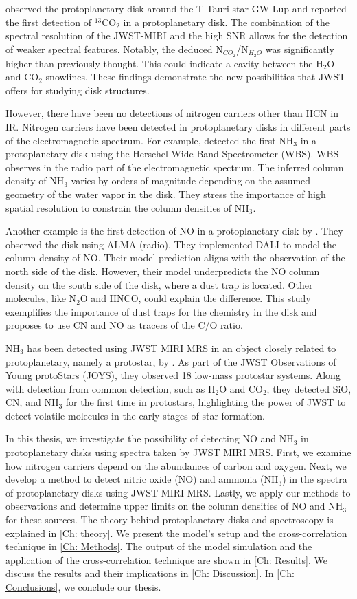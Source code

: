 \documentclass[oneside, single, authoryear, semicolon, 12pt]{lion-msc}
\newcommand{\4}{$_4$}
\newcommand{\3}{$_3$}
\newcommand{\2}{$_2$}
\begin{document}
\cite{Grant_2023} observed the protoplanetary disk around the T Tauri star GW Lup and reported the first detection of $^{13}$CO$_2$ in a protoplanetary disk. The combination of the spectral resolution of the JWST-MIRI and the high SNR allows for the detection of weaker spectral features. Notably, the deduced N$_{CO_2}$/N$_{H_2O}$ was significantly higher than previously thought. This could indicate a cavity between the H$_2$O and CO$_2$ snowlines. These findings demonstrate the new possibilities that JWST offers for studying disk structures. 

However, there have been no detections of nitrogen carriers other than HCN in IR. Nitrogen carriers have been detected in protoplanetary disks in different parts of the electromagnetic spectrum. For example, \cite{Salinas_2016} detected the first NH\3 in a protoplanetary disk using the Herschel Wide Band Spectrometer (WBS). WBS observes in the radio part of the electromagnetic spectrum. The inferred column density of NH\3 varies by orders of magnitude depending on the assumed geometry of the water vapor in the disk. They stress the importance of high spatial resolution to constrain the column densities of NH\3.

Another example is the first detection of NO in a protoplanetary disk by \cite{firstnodetect}. They observed the disk using ALMA (radio). They implemented DALI to model the column density of NO. Their model prediction aligns with the observation of the north side of the disk. However, their model underpredicts the NO column density on the south side of the disk, where a dust trap is located. Other molecules, like N\2O and HNCO, could explain the difference. This study exemplifies the importance of dust traps for the chemistry in the disk and proposes to use CN and NO as tracers of the C/O ratio.

NH\3 has been detected using JWST MIRI MRS in an object closely related to protoplanetary, namely a protostar, by \cite{van_Gelder_2024}. As part of the JWST Observations of Young protoStars (JOYS), they observed 18 low-mass protostar systems. Along with detection from common detection, such as H\2O and CO\2, they detected SiO, CN, and NH\3 for the first time in protostars, highlighting the power of JWST to detect volatile molecules in the early stages of star formation.

In this thesis, we investigate the possibility of detecting NO and NH\3 in protoplanetary disks using spectra taken by JWST MIRI MRS. First, we examine how nitrogen carriers depend on the abundances of carbon and oxygen. Next, we develop a method to detect nitric oxide (NO) and ammonia (NH\3) in the spectra of protoplanetary disks using JWST MIRI MRS. Lastly, we apply our methods to observations and determine upper limits on the column densities of NO and NH\3 for these sources. The theory behind protoplanetary disks and spectroscopy is explained in \autoref{Ch: theory}. We present the model's setup and the cross-correlation technique in \autoref{Ch: Methods}. The output of the model simulation and the application of the cross-correlation technique are shown in \autoref{Ch: Results}. We discuss the results and their implications in \autoref{Ch: Discussion}. In \autoref{Ch: Conclusions}, we conclude our thesis.
\end{document}
